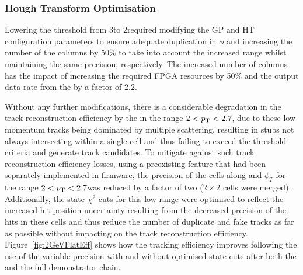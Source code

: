 
\subsubsection{Hough Transform Optimisation}\label{subsubsec:lowPtOptHT}
Lowering the \HT \pT threshold from 3\GeV to 2\GeV required modifying the GP and HT configuration parameters to ensure adequate duplication in $\phi$ and increasing the number of the \qpt columns by 50\% to take into account the increased \pt range whilst maintaining the same precision, respectively.
The increased number of \qpt columns has the impact of increasing the required FPGA resources by 50\% and the output data rate from the \HT by a factor of 2.2.

Without any further modifications, there is a considerable degradation in the track reconstruction efficiency by the \HT in the range $2 < p_{\mathrm{T}} < 2.7$\GeVc, due to these low momentum tracks being dominated by multiple scattering, resulting in stubs not always intersecting within a single \HT cell and thus failing to exceed the threshold criteria and generate track candidates.
To mitigate against such track reconstruction efficiency losses, using a preexisting feature that had been separately implemented in firmware, the precision of the \HT cells along \qpt and $\phi_{T}$ for the range $2 < p_{\mathrm{T}} < 2.7$\GeVc was reduced by a factor of two (\ie $2 \times 2$ cells were merged).
Additionally, the \KF state $\chi^2$ cuts for this low \pT range were optimised to reflect the increased hit position uncertainty resulting from the decreased precision of the hits in these \HT cells and thus reduce the number of duplicate and fake tracks as far as possible without impacting on the \HT track reconstruction efficiency.
Figure~\ref{fig:2GeVFlatEff} shows how the tracking efficiency improves following the use of the variable precision \HT with and without optimised \KF state cuts after both the \HT and the full demonstrator chain. 

